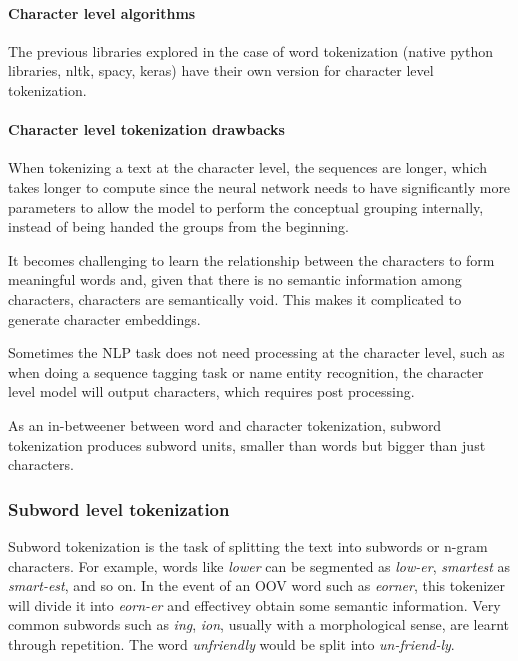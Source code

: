 \paragraph{Character level algorithms}

The previous libraries explored in the case of word tokenization (native python libraries, nltk, spacy, keras) have their own version for character level tokenization.

\paragraph{Character level tokenization drawbacks}

When tokenizing a text at the character level, the sequences are longer, which takes longer to compute since the neural network needs to have significantly more parameters to allow the model to perform the conceptual grouping internally, instead of being handed the groups from the beginning.

It becomes challenging to learn the relationship between the characters to form meaningful words and, given that there is no semantic information among characters, characters are semantically void. This makes it complicated to generate character embeddings.

Sometimes the NLP task does not need processing at the character level, such as when doing a sequence tagging task or name entity recognition, the character level model will output characters, which requires post processing.

As an in-betweener between word and character tokenization, subword tokenization produces subword units, smaller than words but bigger than just characters.

\subsubsection{Subword level tokenization}

Subword tokenization is the task of splitting the text into subwords or n-gram characters. For example, words like \emph{lower} can be segmented as \emph{low-er}, \emph{smartest} as \emph{smart-est}, and so on. In the event of an OOV word such as \emph{eorner}, this tokenizer will divide it into \emph{eorn-er} and effectivey obtain some semantic information. Very common subwords such as \emph{ing}, \emph{ion}, usually with a morphological sense, are learnt through repetition. The word \emph{unfriendly} would be split into \emph{un-friend-ly}.

